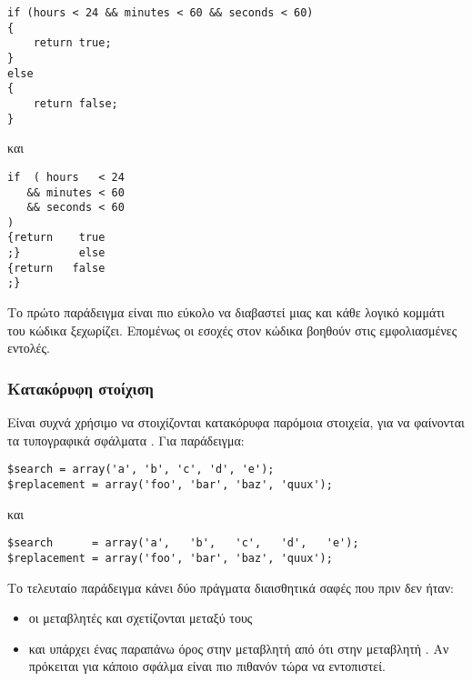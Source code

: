 \begin{lstlisting}[style=cpp,caption= Παράδειγμα εσοχών (1), label=program:indentation(1)]
if (hours < 24 && minutes < 60 && seconds < 60)
{
    return true;
}
else
{
    return false;
}
\end{lstlisting}

και 

\begin{lstlisting}[style=cpp,caption= Παράδειγμα εσοχών (2), label=program:indentation(2)]
if  ( hours   < 24
   && minutes < 60
   && seconds < 60
)
{return    true
;}         else
{return   false
;}
\end{lstlisting}

Το πρώτο παράδειγμα είναι πιο εύκολο να διαβαστεί μιας και κάθε λογικό κομμάτι του κώδικα ξεχωρίζει. Επομένως οι εσοχές στον κώδικα βοηθούν στις εμφολιασμένες εντολές.


\subsubsection{Κατακόρυφη στοίχιση}

Είναι συχνά χρήσιμο να στοιχίζονται κατακόρυφα παρόμοια στοιχεία, για να φαίνονται τα τυπογραφικά σφάλματα \cite{wiki:Programming_style}. Για παράδειγμα:

\begin{lstlisting}[style=cpp, caption= Κατακόρυφη στοίχιση (1), label=program:vertical_aligment(1)]
$search = array('a', 'b', 'c', 'd', 'e');
$replacement = array('foo', 'bar', 'baz', 'quux');
\end{lstlisting}
 
και

\begin{lstlisting}[style=cpp, caption= Κατακόρυφη στοίχιση (2), label=program:vertical_aligment(2)]
$search      = array('a',   'b',   'c',   'd',   'e');
$replacement = array('foo', 'bar', 'baz', 'quux');
\end{lstlisting}

Το τελευταίο παράδειγμα κάνει δύο πράγματα διαισθητικά σαφές που πριν δεν ήταν:

\begin{itemize}
\item οι μεταβλητές  και  σχετίζονται μεταξύ τους
\item και υπάρχει ένας παραπάνω όρος στην μεταβλητή  από ότι στην μεταβλητή . Αν πρόκειται για κάποιο σφάλμα είναι πιο πιθανόν τώρα να εντοπιστεί.
\end{itemize}


